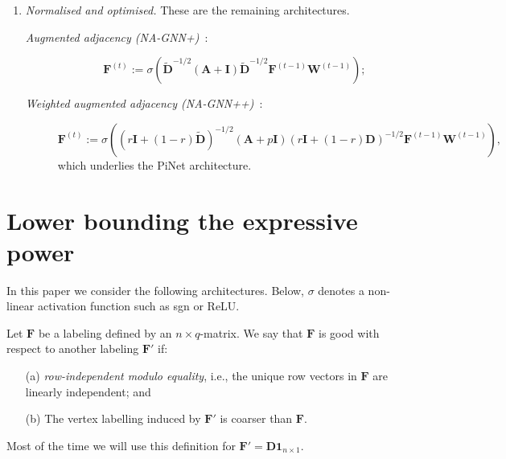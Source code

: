 \begin{enumerate}
\item \emph{Normalised and optimised.} These are the remaining architectures.
\begin{description}
\item[\textit{Augmented adjacency (NA-GNN+)}~\cite{kipf-loose}:] %
$$
\mathbf{F}^{(t)}:=\sigma\left(\tilde{\mathbf{D}}^{-1/2}(\mathbf{A}+\mathbf{I})\tilde{\mathbf{D}}^{-1/2}\mathbf{F}^{(t-1)}\mathbf{W}^{(t-1)}\right);
$$
\item[\textit{Weighted augmented adjacency (NA-GNN++)}~\cite{DBLP:journals/corr/abs-1905-03046}:]
$$\mathbf{F}^{(t)}:=\sigma\left((r\mathbf{I}+(1-r)\tilde{\mathbf{D}})^{-1/2}(\mathbf{A}+p\mathbf{I})(r\mathbf{I}+(1-r)\mathbf{D})^{-1/2}\mathbf{F}^{(t-1)}\mathbf{W}^{(t-1)}\right),
$$
which underlies the PiNet architecture.
\end{description}
\end{enumerate}


\section{Lower bounding the expressive power}

In this paper we consider the following architectures. Below, $\sigma$ denotes a non-linear activation function such as sgn or ReLU. 

\begin{definition}\label{def:label}
Let $\mathbf{F}$ be a labeling defined by an $n\times q$-matrix. 
We say that $\mathbf{F}$ is good with respect to another labeling $\mathbf{F}'$ if:
\begin{enumerate}
\item[(a)] \textit{row-independent modulo equality}, i.e., the unique row vectors in $\mathbf{F}$ are linearly independent; and
\item[(b)] 
The vertex labelling induced by $\mathbf{F}'$ is coarser than  $\mathbf{F}$.
\end{enumerate}
\end{definition}
Most of the time we will use this definition for $\mathbf{F}' = \mathbf{D} \mathbf{1}_{n \times 1}$.
